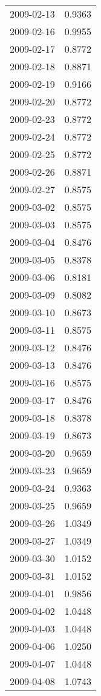 \begin{tabular}{lr}
2009-02-13 &      0.9363 \\
2009-02-16 &      0.9955 \\
2009-02-17 &      0.8772 \\
2009-02-18 &      0.8871 \\
2009-02-19 &      0.9166 \\
2009-02-20 &      0.8772 \\
2009-02-23 &      0.8772 \\
2009-02-24 &      0.8772 \\
2009-02-25 &      0.8772 \\
2009-02-26 &      0.8871 \\
2009-02-27 &      0.8575 \\
2009-03-02 &      0.8575 \\
2009-03-03 &      0.8575 \\
2009-03-04 &      0.8476 \\
2009-03-05 &      0.8378 \\
2009-03-06 &      0.8181 \\
2009-03-09 &      0.8082 \\
2009-03-10 &      0.8673 \\
2009-03-11 &      0.8575 \\
2009-03-12 &      0.8476 \\
2009-03-13 &      0.8476 \\
2009-03-16 &      0.8575 \\
2009-03-17 &      0.8476 \\
2009-03-18 &      0.8378 \\
2009-03-19 &      0.8673 \\
2009-03-20 &      0.9659 \\
2009-03-23 &      0.9659 \\
2009-03-24 &      0.9363 \\
2009-03-25 &      0.9659 \\
2009-03-26 &      1.0349 \\
2009-03-27 &      1.0349 \\
2009-03-30 &      1.0152 \\
2009-03-31 &      1.0152 \\
2009-04-01 &      0.9856 \\
2009-04-02 &      1.0448 \\
2009-04-03 &      1.0448 \\
2009-04-06 &      1.0250 \\
2009-04-07 &      1.0448 \\
2009-04-08 &      1.0743 \\

\end{tabular}
